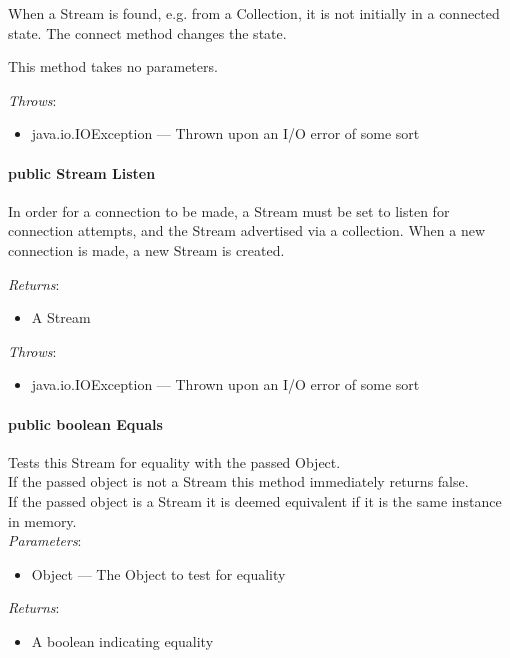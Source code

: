 \documentclass[$Date: 2003/06/26 19:29:31 $]{glabarticle}
\begin{document}
When a Stream is found, e.g. from a Collection, it is not initially in
a connected state.  The connect method changes the state.

This method takes no parameters.

\textit{Throws}:
\begin{itemize}
\item[] java.io.IOException --- Thrown upon an I/O error of some sort 
\end{itemize}

\paragraph{public Stream Listen}

In order for a connection to be made, a Stream must be set to listen
for connection attempts, and the Stream advertised via a collection.
When a new connection is made, a new Stream is created.

\textit{Returns}:
\begin{itemize}
\item[] A Stream
\end{itemize}

\textit{Throws}:
\begin{itemize}
\item[] java.io.IOException --- Thrown upon an I/O error of some sort 
\end{itemize}

\paragraph{public boolean Equals}

Tests this Stream for equality with the passed Object.\\

If the passed object is not a Stream this method immediately returns false. \\

If the passed object is a Stream it is deemed equivalent if it is the same instance in memory. \\

\textit{Parameters}:
\begin{itemize}
\item[] Object --- The Object to test for equality 
\end{itemize}

\textit{Returns}:
\begin{itemize}
\item[] A boolean indicating equality
\end{itemize}
\end{document}
